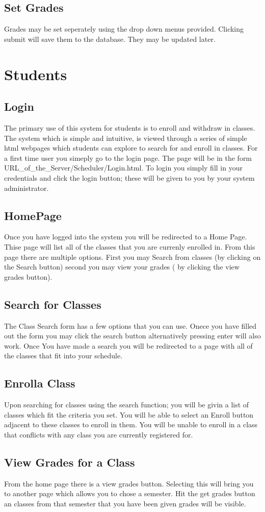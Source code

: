 \documentclass[11pt,oneside,a4paper]{article}
\begin{document}
\subsection{Set Grades}
Grades may be set seperately using the drop down menus provided.  Clicking submit will save
 them to the database.  They may be updated later.
\section{Students}
\subsection{Login}
The primary use of this system for students is to enroll and withdraw in classes.  
The system which is simple and intuitive, is viewed through a series of simple html webpages 
which students can explore to search for and enroll in classes.  For a first time user you 
simeply go to the login page.  The page will be in the form URL_of_the_Server/Scheduler/Login.html. 
 To login you simply fill in your credentials and click the login button; these will be 
given to you by your system administrator.  
\subsection{HomePage}
Once you have logged into the system you will be redirected to a Home Page.  Thise page 
will list all of the classes that you are currenly enrolled in.  From this page there are 
multiple options. First you may Search from classes (by clicking on the Search button) 
second you may view your grades ( by clicking the view grades button).
\subsection{Search for Classes}
The Class Search form has a few options that you can use. Onece you have filled out the 
form you may click the search button alternatively pressing enter will also work. Once
You have made a search you will be redirected to a page with all of the classes that 
fit into your schedule.  
\subsection{Enrolla Class}
Upon searching for classes using the search function; you will be givin a list of classes which
fit the criteria you set.  You will be able to select an Enroll button adjacent to these classes
to enroll in them.  You will be unable to enroll in a class that conflicts with any class you are
 currently registered for. 
\subsection{View Grades for a Class}
From the home page there is a view grades button. Selecting this will bring you to another page
 which allows you to chose a semester.  Hit the get grades button an classes from that semester
 that you have been given grades will be visible.
\end{document}
